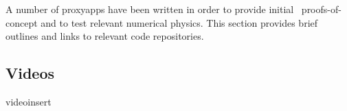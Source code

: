 A number of proxyapps have been written in order to provide initial \nep \ proofs-of-concept and to test relevant 
numerical physics.  This section provides brief outlines and links to relevant code repositories.




\begin{warpHTML}
\ForceHTMLPage {} \chapter*{Videos} \label{sec:videos}  {}
videoinsert
\end{warpHTML}


